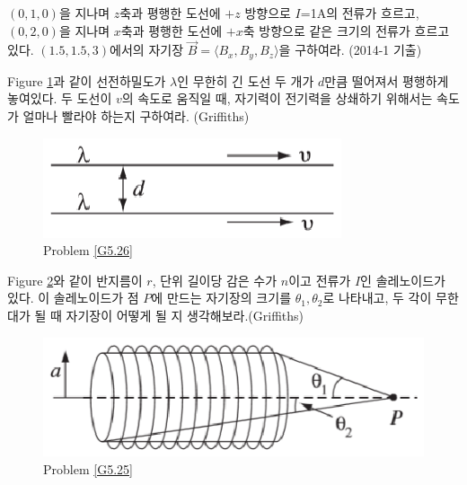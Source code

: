 \begin{problem}
$(0,1,0)$을 지나며 $z$축과 평행한 도선에 $+z$ 방향으로 $I$=1A의 전류가 흐르고, $(0,2,0)$을 지나며 $x$축과 평행한 도선에 $+x$축 방향으로 같은 크기의 전류가 흐르고 있다. $(1.5, 1.5, 3)$에서의 자기장 $\vec{B}=\langle B_x, B_y, B_z \rangle$을 구하여라. (2014-1 기출)
\end{problem}

\begin{problem}\label{G5.26}
Figure \ref{fig:G5.26}과 같이 선전하밀도가 $\lambda$인 무한히 긴 도선 두 개가 $d$만큼 떨어져서 평행하게 놓여있다. 두 도선이 $v$의 속도로 움직일 때, 자기력이 전기력을 상쇄하기 위해서는 속도가 얼마나 빨라야 하는지 구하여라. (Griffiths)

\begin{figure}[h]
\centering\includegraphics[scale=1.2]{Pictures/G5.26.eps}
\caption{Problem \ref{G5.26}}
\label{fig:G5.26} %
\end{figure}
\end{problem}

\begin{problem}\label{G5.25}
Figure \ref{fig:G5.25}와 같이 반지름이 $r$, 단위 길이당 감은 수가 $n$이고 전류가 $I$인 솔레노이드가 있다. 이 솔레노이드가 점 $P$에 만드는 자기장의 크기를 $\theta_1, \theta_2$로 나타내고, 두 각이 무한대가 될 때 자기장이 어떻게 될 지 생각해보라.(Griffiths)
\begin{figure}[h]
\centering\includegraphics[scale=1.2]{Pictures/G5.25.eps}
\caption{Problem \ref{G5.25}}
\label{fig:G5.25} %
\end{figure}
\end{problem}

